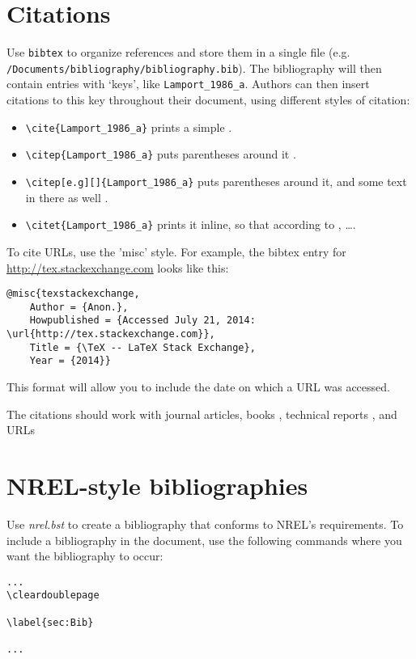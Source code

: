 \section{Citations}
\label{Sec:Bib}
Use \texttt{bibtex} to organize references and store them in a single file (e.g. \verb+/Documents/bibliography/bibliography.bib+). The bibliography will then contain entries with `keys', like \texttt{Lamport\_1986\_a}. Authors can then insert citations to this key throughout their document, using different styles of citation:
\begin{itemize}
\item \verb+\cite{Lamport_1986_a}+ prints a simple \cite{Lamport_1986_a}.
\item \verb+\citep{Lamport_1986_a}+ puts parentheses around it \citep{Lamport_1986_a}.
\item \verb+\citep[e.g][]{Lamport_1986_a}+ puts parentheses around it, and some text in there as well \citep[e.g.][]{Lamport_1986_a}.
\item \verb+\citet{Lamport_1986_a}+ prints it inline, so that according to \citet{Lamport_1986_a}, \ldots.
\end{itemize}

To cite URLs, use the 'misc' style. For example, the bibtex entry for \href{http://tex.stackexchange.com}{http://tex.stackexchange.com}\cite{texstackexchange} looks like this:

\begin{verbatim}
@misc{texstackexchange,
	Author = {Anon.},
	Howpublished = {Accessed July 21, 2014: \url{http://tex.stackexchange.com}},
	Title = {\TeX -- LaTeX Stack Exchange},
	Year = {2014}}
\end{verbatim}

This format will allow you to include the date on which a URL was accessed.

The citations should work with journal articles, books \citep{Lamport_1986_a}, technical reports \citep{TechReportTest}, and URLs \citep{texstackexchange}

\section{NREL-style bibliographies}
Use \emph{nrel.bst} to create a bibliography that conforms to NREL's requirements. To include a bibliography in the document, use the following commands where you want the bibliography to occur:

\begin{verbatim}
...
\cleardoublepage

\label{sec:Bib}

...
\end{verbatim}

